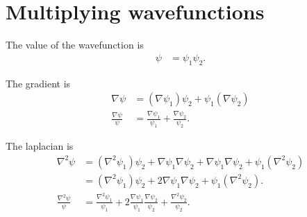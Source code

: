 \section{Multiplying wavefunctions}

The value of the wavefunction is
\begin{align}
\psi &= \psi_1  \psi_2.
\end{align}

The gradient is
\begin{align}
\nabla \psi &= (\nabla \psi_1) \psi_2 + \psi_1 (\nabla \psi_2) \\
\frac{\nabla \psi}{\psi} &= \frac{\nabla \psi_1}{\psi_1} + \frac{\nabla \psi_2}{\psi_2}.
\end{align}

The laplacian is
\begin{align}
\nabla^2 \psi 
&= (\nabla^2 \psi_1) \psi_2 + \nabla \psi_1 \nabla \psi_2 + \nabla \psi_1 \nabla \psi_2 + \psi_1 (\nabla^2 \psi_2) \\
&= (\nabla^2 \psi_1) \psi_2 + 2 \nabla \psi_1 \nabla \psi_2 + \psi_1 (\nabla^2 \psi_2). \\
\frac{\nabla^2 \psi}{\psi} &= \frac{\nabla^2 \psi_1}{\psi_1} + 2 \frac{\nabla \psi_1}{\psi_1} \frac{\nabla \psi_2}{\psi_2} + \frac{\nabla^2 \psi_2}{\psi_2}.
\end{align}
